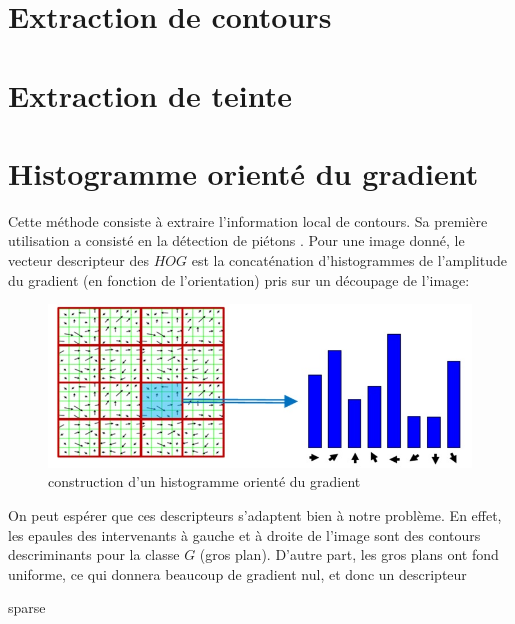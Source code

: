 \documentclass{book}
\begin{document}
\section{Extraction de contours}
\section{Extraction de teinte}
\section{Histogramme orienté du gradient}

Cette méthode consiste à extraire l'information local de contours. Sa première utilisation a consisté en 
la détection de piétons \cite{hog}. Pour une image donné, le vecteur descripteur des $HOG$ est la concaténation
d'histogrammes de l'amplitude du gradient (en fonction de l'orientation) pris sur un découpage de l'image:
\begin{figure}[H]
\begin{center}
\includegraphics[scale=0.5]{hog.jpg}
\end{center}
\caption{construction d'un histogramme orienté du gradient \cite{hog2}}
\label{hog}
\end{figure}

On peut espérer que ces descripteurs s'adaptent bien à notre problème. En effet, les epaules des intervenants à gauche 
et à droite de l'image sont des contours descriminants pour la classe $G$ (gros plan). D'autre part, les gros plans ont fond uniforme, 
ce qui donnera beaucoup de gradient nul, et donc un descripteur \begin{itshape}sparse\end{itshape}
\end{document}
